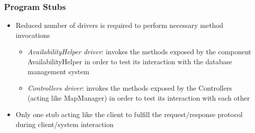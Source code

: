 \begin{frame}
	\frametitle{Program Stubs}
	\begin{itemize}

		\item Reduced number of drivers is required to perform necessary method invocations
		\begin{itemize}
			\item \emph{AvailabilityHelper driver}: invokes the methods exposed by the component AvailabilityHelper in order to test its interaction with the database management system
			\item \emph{Controllers driver}: invokes the methods exposed by the Controllers (acting like MapManager) in order to test its interaction with each other
		\end{itemize}
		\item Only one stub acting like the client to fulfill the request/response protocol during client/system interaction
	\end{itemize}
\end{frame}